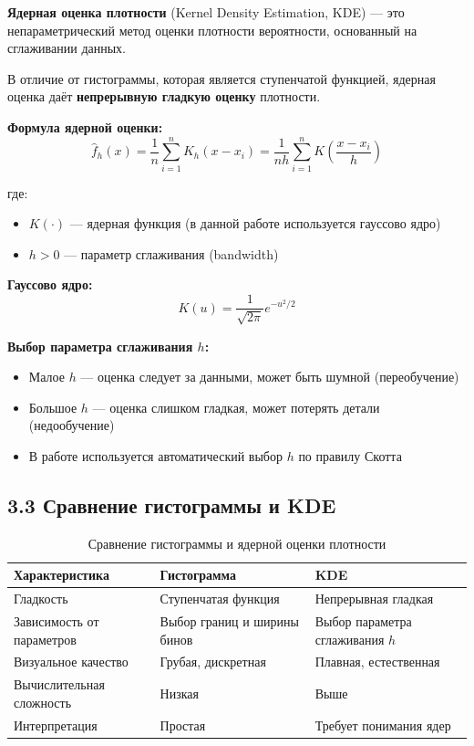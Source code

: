 \documentclass[a4paper,14pt]{extarticle}
\begin{document}
\textbf{Ядерная оценка плотности} (Kernel Density Estimation, KDE) — это непараметрический метод оценки плотности вероятности, основанный на сглаживании данных.

В отличие от гистограммы, которая является ступенчатой функцией, ядерная оценка даёт \textbf{непрерывную гладкую оценку} плотности.

\textbf{Формула ядерной оценки:}
\begin{equation}
\hat{f}_h(x) = \frac{1}{n} \sum_{i=1}^{n} K_h(x - x_i) = \frac{1}{nh} \sum_{i=1}^{n} K\left(\frac{x - x_i}{h}\right)
\end{equation}

где:
\begin{itemize}
    \item $K(\cdot)$ — ядерная функция (в данной работе используется гауссово ядро)
    \item $h > 0$ — параметр сглаживания (bandwidth)
\end{itemize}

\textbf{Гауссово ядро:}
\begin{equation}
K(u) = \frac{1}{\sqrt{2\pi}} e^{-u^2/2}
\end{equation}

\textbf{Выбор параметра сглаживания $h$:}
\begin{itemize}
    \item Малое $h$ — оценка следует за данными, может быть шумной (переобучение)
    \item Большое $h$ — оценка слишком гладкая, может потерять детали (недообучение)
    \item В работе используется автоматический выбор $h$ по правилу Скотта
\end{itemize}

\subsection*{3.3 Сравнение гистограммы и KDE}

\begin{table}[H]
\centering
\caption{Сравнение гистограммы и ядерной оценки плотности}
\begin{tabular}{|l|p{5cm}|p{5cm}|}
\hline
\textbf{Характеристика} & \textbf{Гистограмма} & \textbf{KDE} \\
\hline
Гладкость & Ступенчатая функция & Непрерывная гладкая \\
\hline
Зависимость от параметров & Выбор границ и ширины бинов & Выбор параметра сглаживания $h$ \\
\hline
Визуальное качество & Грубая, дискретная & Плавная, естественная \\
\hline
Вычислительная сложность & Низкая & Выше \\
\hline
Интерпретация & Простая & Требует понимания ядер \\
\hline
\end{tabular}
\end{table}
\end{document}
